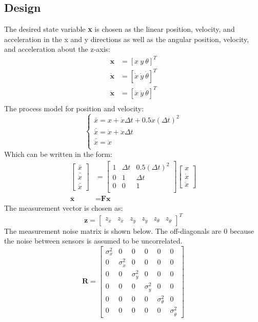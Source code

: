 \subsection{Design}
The desired state variable \textbf{x} is chosen as the linear position, velocity, and acceleration in the x and y directions as well as the angular position, velocity, and acceleration about the z-axis:
\begin{align*}
\textbf{x} &= [x\ y\ \theta]^T\\
\dot{\textbf{x}} &= [\dot{x}\ \dot{y}\ \dot{\theta}]^T\\
\ddot{\textbf{x}} &= [\ddot{x}\ \ddot{y}\ \ddot{\theta}]^T\\
\end{align*}
The process model for position and velocity:
\[ \begin{cases} 
\bar{x}=x+\dot{x}\Delta t+0.5\ddot{x}(\Delta t)^2\\
\bar{\dot{x}}=\dot{x}+\ddot{x}\Delta t\\
\bar{\ddot{x}}=\ddot{x}\\
\end{cases} \]
Which can be written in the form:
\begin{align*}
\begin{bmatrix}\bar{x}\\ \bar{\dot{x}}\\ \bar{\ddot{x}} \end{bmatrix} &=
\begin{bmatrix}1 & \Delta t & 0.5(\Delta t)^2 \\
0 & 1 & \Delta t \\
0 & 0 & 1 \\\end{bmatrix}
\begin{bmatrix}x\\ \dot{x}\\ \ddot{x} \end{bmatrix}\\ 
\bar{\textbf{x}}&=\textbf{F}\textbf{x}
\end{align*}
The measurement vector is chosen as:
\[\textbf{z}=
\begin{bmatrix}z_x & z_{\ddot{x}} & z_y & z_{\ddot{y}} & z_{\theta} & z_{\dot{\theta}} \end{bmatrix}^T\]
The measurement noise matrix is shown below. The off-diagonals are 0 because the noise between sensors is assumed to be uncorrelated.
\[\textbf{R}=
\begin{bmatrix}\sigma^2_x & 0 & 0 & 0 &0 & 0\\
0 & \sigma^2_{\ddot{x}} & 0 & 0 & 0 & 0\\
0 & 0 & \sigma^2_y & 0 & 0 & 0 \\
0 & 0 & 0 & \sigma^2_{\ddot{y}} & 0 & 0\\
0 & 0 & 0 & 0 & \sigma^2_{\theta} & 0\\
0 & 0 & 0 & 0 & 0 & \sigma^2_{\dot{\theta}} \end{bmatrix}\]